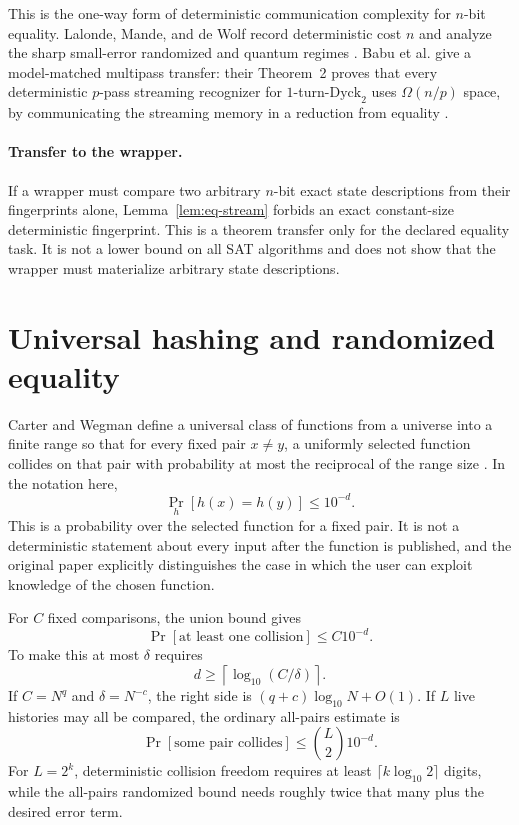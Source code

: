 \documentclass[11pt]{article}
\begin{document}
This is the one-way form of deterministic communication complexity for
$n$-bit equality.  Lalonde, Mande, and de Wolf record deterministic cost $n$
and analyze the sharp small-error randomized and quantum regimes
\cite{lalonde2023}.  Babu et al. give a model-matched multipass transfer:
their Theorem~2 proves that every deterministic $p$-pass streaming
recognizer for $1$-turn-$\mathrm{Dyck}_2$ uses $\Omega(n/p)$ space, by
communicating the streaming memory in a reduction from equality
\cite{babu2011}.

\paragraph{Transfer to the wrapper.}
If a wrapper must compare two arbitrary $n$-bit exact state descriptions
from their fingerprints alone, Lemma~\ref{lem:eq-stream} forbids an exact
constant-size deterministic fingerprint.  This is a theorem transfer only
for the declared equality task.  It is not a lower bound on all SAT
algorithms and does not show that the wrapper must materialize arbitrary
state descriptions.

\section{Universal hashing and randomized equality}

Carter and Wegman define a universal class of functions from a universe into
a finite range so that for every fixed pair $x\ne y$, a uniformly selected
function collides on that pair with probability at most the reciprocal of
the range size \cite{carterwegman1979}.  In the notation here,
\[
 \Pr_h[h(x)=h(y)]\le 10^{-d}.
 \tag{5}
\]
This is a probability over the selected function for a fixed pair.  It is
not a deterministic statement about every input after the function is
published, and the original paper explicitly distinguishes the case in
which the user can exploit knowledge of the chosen function.

For $C$ fixed comparisons, the union bound gives
\[
 \Pr[\text{at least one collision}]\le C10^{-d}.
 \tag{6}
\]
To make this at most $\delta$ requires
\[
 d\ge \left\lceil\log_{10}(C/\delta)\right\rceil.
 \tag{7}
\]
If $C=N^q$ and $\delta=N^{-c}$, the right side is
$(q+c)\log_{10}N+O(1)$.  If $L$ live histories may all be compared, the
ordinary all-pairs estimate is
\[
 \Pr[\text{some pair collides}]
 \le \binom{L}{2}10^{-d}.
 \tag{8}
\]
For $L=2^k$, deterministic collision freedom requires at least
$\lceil k\log_{10}2\rceil$ digits, while the all-pairs randomized bound needs
roughly twice that many plus the desired error term.
\end{document}
